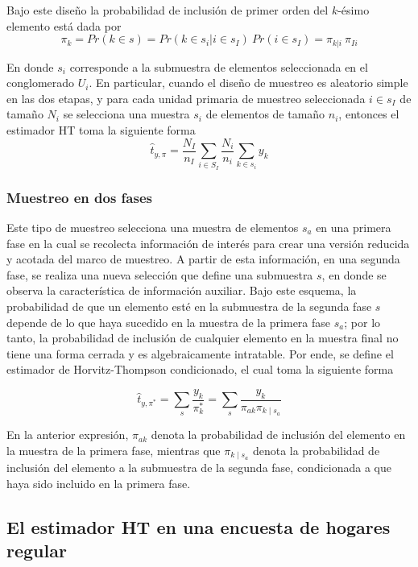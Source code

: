 \documentclass[
  12pt,
]{book}
\begin{document}
Bajo este diseño la probabilidad de inclusión de primer orden del \(k\)-ésimo elemento está dada por
\[
\pi_{k}=Pr(k\in s)=Pr(k\in s_i|i\in s_I)\ Pr(i\in s_I)=\pi_{k|i}\ \pi_{Ii}
\]

En donde \(s_i\) corresponde a la submuestra de elementos seleccionada en el conglomerado \(U_i\). En particular, cuando el diseño de muestreo es aleatorio simple en las dos etapas, y para cada unidad primaria de muestreo seleccionada \(i\in s_{I}\) de tamaño \(N_i\) se selecciona una muestra \(s_i\) de elementos de tamaño \(n_i\), entonces el estimador HT toma la siguiente forma
\[
\hat{t}_{y,\pi}=\frac{N_{I}}{n_{I}}\sum_{i\in S_{I}}\frac{N_i}{n_i}\sum_{k\in s_i}y_k
\]

\hypertarget{muestreo-en-dos-fases-1}{%
\subsubsection{Muestreo en dos fases}\label{muestreo-en-dos-fases-1}}

Este tipo de muestreo selecciona una muestra de elementos \(s_a\) en una primera fase en la cual se recolecta información de interés para crear una versión reducida y acotada del marco de muestreo. A partir de esta información, en una segunda fase, se realiza una nueva selección que define una submuestra \(s\), en donde se observa la característica de información auxiliar. Bajo este esquema, la probabilidad de que un elemento esté en la submuestra de la segunda fase \(s\) depende de lo que haya sucedido en la muestra de la primera fase \(s_a\); por lo tanto, la probabilidad de inclusión de cualquier elemento en la muestra final no tiene una forma cerrada y es algebraicamente intratable. Por ende, se define el estimador de Horvitz-Thompson condicionado, el cual toma la siguiente forma

\[
\hat{t}_{y,\pi^*}=\sum_{s}\frac{y_k}{\pi_{k}^*}=\sum_{s}\frac{y_k}{\pi_{ak}\pi_{k\mid{s_a}}}
\]

En la anterior expresión, \(\pi_{ak}\) denota la probabilidad de inclusión del elemento en la muestra de la primera fase, mientras que \(\pi_{k\mid{s_a}}\) denota la probabilidad de inclusión del elemento a la submuestra de la segunda fase, condicionada a que haya sido incluido en la primera fase.

\hypertarget{el-estimador-ht-en-una-encuesta-de-hogares-regular}{%
\subsection{El estimador HT en una encuesta de hogares regular}\label{el-estimador-ht-en-una-encuesta-de-hogares-regular}}
\end{document}
